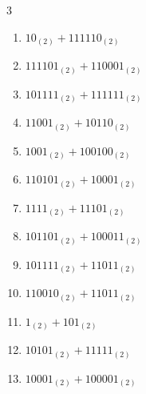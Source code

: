 \begin{multicols}{3}
\begin{enumerate}
  \item $10_{(2)} + 111110_{(2)}$


  \item $111101_{(2)} + 110001_{(2)}$


  \item $101111_{(2)} + 111111_{(2)}$


  \item $11001_{(2)} + 10110_{(2)}$


  \item $1001_{(2)} + 100100_{(2)}$


  \item $110101_{(2)} + 10001_{(2)}$


\columnbreak %

\resetques

  \item $1111_{(2)} + 11101_{(2)}$


  \item $101101_{(2)} + 100011_{(2)}$


  \item $101111_{(2)} + 11011_{(2)}$


  \item $110010_{(2)} + 11011_{(2)}$


  \item $1_{(2)} + 101_{(2)}$


  \item $10101_{(2)} + 11111_{(2)}$


  \item $10001_{(2)} + 100001_{(2)}$



\end{enumerate}
\end{multicols}
